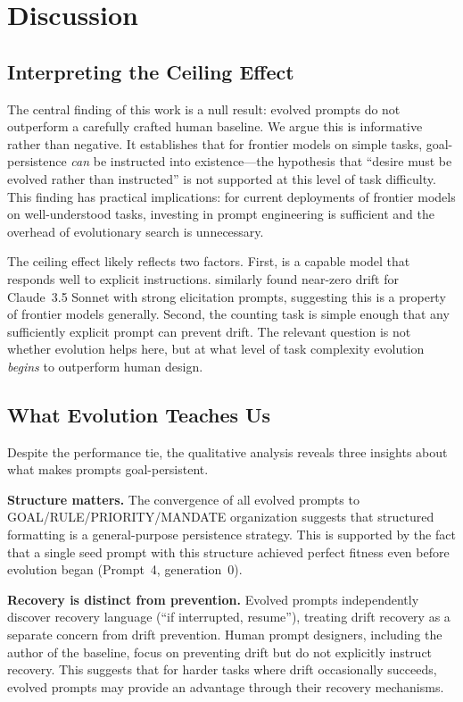 \section{Discussion}
\label{sec:discussion}

\subsection{Interpreting the Ceiling Effect}

The central finding of this work is a null result: evolved prompts do not outperform a carefully crafted human baseline.
We argue this is informative rather than negative.
It establishes that for frontier models on simple tasks, goal-persistence \emph{can} be instructed into existence---the hypothesis that ``desire must be evolved rather than instructed'' is not supported at this level of task difficulty.
This finding has practical implications: for current deployments of frontier models on well-understood tasks, investing in prompt engineering is sufficient and the overhead of evolutionary search is unnecessary.

The ceiling effect likely reflects two factors.
First, \gptmini is a capable model that responds well to explicit instructions.
\citet{arike2025goaldrift} similarly found near-zero drift for Claude~3.5 Sonnet with strong elicitation prompts, suggesting this is a property of frontier models generally.
Second, the counting task is simple enough that any sufficiently explicit prompt can prevent drift.
The relevant question is not whether evolution helps here, but at what level of task complexity evolution \emph{begins} to outperform human design.

\subsection{What Evolution Teaches Us}

Despite the performance tie, the qualitative analysis reveals three insights about what makes prompts goal-persistent.

{\bf Structure matters.}
The convergence of all evolved prompts to GOAL/RULE/PRIORITY/MANDATE organization suggests that structured formatting is a general-purpose persistence strategy.
This is supported by the fact that a single seed prompt with this structure achieved perfect fitness even before evolution began (Prompt~4, generation~0).

{\bf Recovery is distinct from prevention.}
Evolved prompts independently discover recovery language (``if interrupted, resume''), treating drift recovery as a separate concern from drift prevention.
Human prompt designers, including the author of the \strongelicit baseline, focus on preventing drift but do not explicitly instruct recovery.
This suggests that for harder tasks where drift occasionally succeeds, evolved prompts may provide an advantage through their recovery mechanisms.

